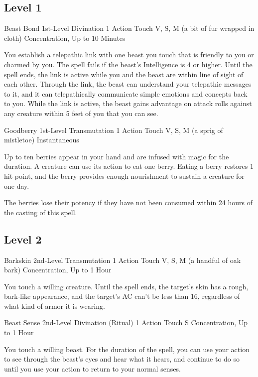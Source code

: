 \documentclass[letterpaper,openany,oneside,twocolumn]{book}
\begin{document}
\subsection*{Level 1}

\DndSpellHeader
  {Beast Bond}
  {1st-Level Divination}
  {1 Action}
  {Touch}
  {V, S, M (a bit of fur wrapped in cloth)}
  {Concentration, Up to 10 Minutes}

You establish a telepathic link with one beast you touch that is friendly to you or charmed by you. The spell fails if the beast's Intelligence is 4 or higher. Until the spell ends, the link is active while you and the beast are within line of sight of each other. Through the link, the beast can understand your telepathic messages to it, and it can telepathically communicate simple emotions and concepts back to you. While the link is active, the beast gains advantage on attack rolls against any creature within 5 feet of you that you can see.

\DndSpellHeader
  {Goodberry}
  {1st-Level Transmutation}
  {1 Action}
  {Touch}
  {V, S, M (a sprig of mistletoe)}
  {Instantaneous}

Up to ten berries appear in your hand and are infused with magic for the duration. A creature can use its action to eat one berry. Eating a berry restores 1 hit point, and the berry provides enough nourishment to sustain a creature for one day.

The berries lose their potency if they have not been consumed within 24 hours of the casting of this spell.

\subsection*{Level 2}

\DndSpellHeader
  {Barkskin}
  {2nd-Level Transmutation}
  {1 Action}
  {Touch}
  {V, S, M (a handful of oak bark)}
  {Concentration, Up to 1 Hour}

You touch a willing creature. Until the spell ends, the target's skin has a rough, bark-like appearance, and the target's AC can't be less than 16, regardless of what kind of armor it is wearing.

\DndSpellHeader
  {Beast Sense}
  {2nd-Level Divination (Ritual)}
  {1 Action}
  {Touch}
  {S}
  {Concentration, Up to 1 Hour}

You touch a willing beast. For the duration of the spell, you can use your action to see through the beast's eyes and hear what it hears, and continue to do so until you use your action to return to your normal senses.
\end{document}
